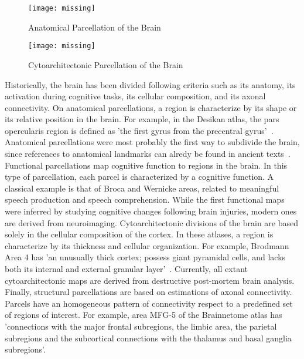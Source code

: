\begin{figure}[h!]
    \texttt{[image: missing]}
    \caption{Anatomical Parcellation of the Brain}
    \label{fig:brain_function}
\end{figure}

\begin{figure*}[t!]
    \texttt{[image: missing]}
    \caption{Cytoarchitectonic Parcellation of the Brain}
    \label{fig:brain_function}
\end{figure*}

Historically, the brain has been divided following criteria such as its anatomy,
its activation during cognitive tasks, its cellular composition, and its axonal
connectivity. On anatomical parcellations, a region is characterize by its
shape or its relative position in the brain. For example, in the Desikan atlas,
the pars opercularis region is defined as 'the first gyrus from the precentral
gyrus'~\cite{Desikan2006}. Anatomical parcellations were most probably the first
way to subdivide the brain, since references to anatomical landmarks can alredy
be found in ancient texts~\cite{Elsberg1945, Collice2008}. Functional parcellations
map cognitive function to regions in the brain. In this type of parcellation,
each parcel is characterized by a cognitive function. A classical example is that
of Broca and Wernicke areas, related to meaningful speech production and speech
comprehension. While the first functional maps were inferred by studying cognitive
changes following brain injuries, modern ones are derived from neuroimaging.
Cytoarchitectonic divisions of the brain are
based solely in the cellular composition of the cortex. In these atlases, a region
is characterize by its thickness and cellular organization. For example,
Brodmann Area 4 has 'an unusually thick cortex; possess giant pyramidal cells,
and lacks both its internal and external granular layer'~\cite{Brodmann1909}.
Currently, all extant cytoarchitectonic maps are derived from destructive
post-mortem brain analysis.
Finally, structural parcellations are based on estimations of axonal connectivity.
Parcels have an homogeneous pattern of connectivity respect to a predefined set of regions of
interest. For example, area MFG-5 of the Brainnetome atlas has 'connections 
with the major frontal subregions, the limbic area, the parietal subregions
and the subcortical connections with the thalamus and basal ganglia subregions'\cite{Fan2016}.

